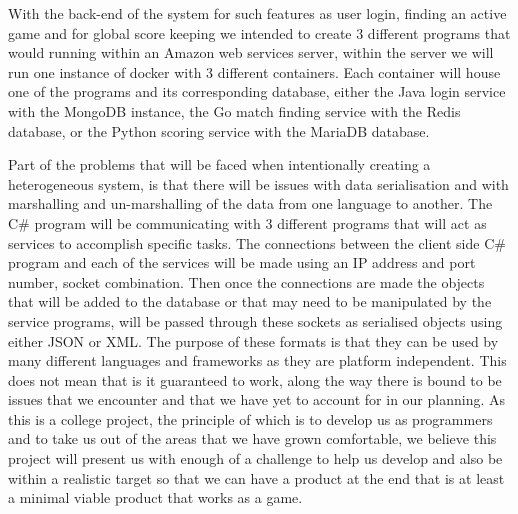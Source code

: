 With the back-end of the system for such features as user login, finding an active game and for global score keeping we intended to create 3 different programs that would running within an Amazon web services server, within the server we will run one instance of docker with 3 different containers. Each container will house one of the programs and its corresponding database, either the Java login service with the MongoDB instance, the Go match finding service with the Redis database, or the Python scoring service with the MariaDB database. \newline \newline

Part of the problems that will be faced when intentionally creating a heterogeneous system, is that there will be issues with data serialisation and with marshalling and un-marshalling of the data from one language to another. The C\# program will be communicating with 3 different programs that will act as services to accomplish specific tasks. The connections between the client side C\# program and each of the services will be made using an IP address and port number, socket combination. Then once the connections are made the objects that will be added to the database or that may need to be manipulated by the service programs, will be passed through these sockets as serialised objects using either JSON or XML. The purpose of these formats is that they can be used by many different languages and frameworks as they are platform independent. This does not mean that is it guaranteed to work, along the way there is bound to be issues that we encounter and that we have yet to account for in our planning. As this is a college project, the principle of which is to develop us as programmers and to take us out of the areas that we have grown comfortable, we believe this project will present us with enough of a challenge to help us develop and also be within a realistic target so that we can have a product at the end that is at least a minimal viable product that works as a game. \newline

